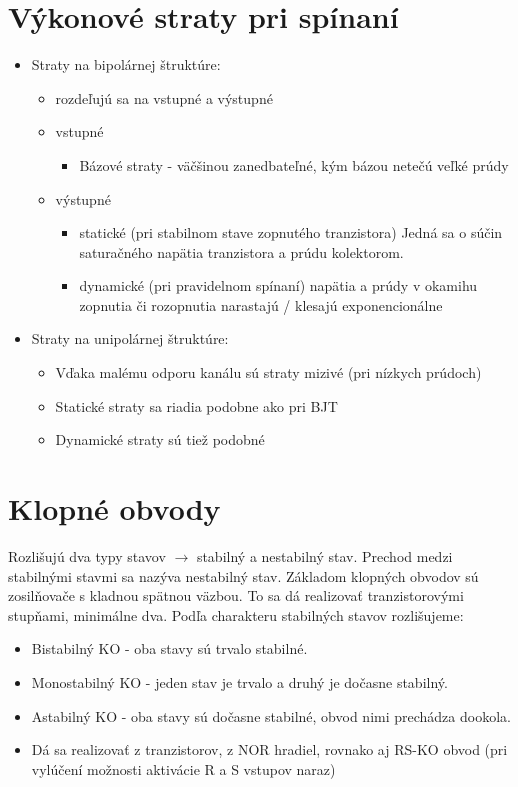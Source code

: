\section{Výkonové straty pri spínaní}
\begin{itemize}
	\item  Straty na bipolárnej štruktúre:
	\begin{itemize}
		\item rozdeľujú sa na vstupné a výstupné
		\item vstupné
		\begin{itemize}
			\item Bázové straty - väčšinou zanedbateľné, kým bázou netečú veľké prúdy
		\end{itemize}
		\item výstupné
		\begin{itemize}
			\item statické (pri stabilnom stave zopnutého tranzistora)
			\subitem Jedná sa o súčin saturačného napätia tranzistora a prúdu kolektorom.
			\item dynamické (pri pravidelnom spínaní)
			\subitem napätia a prúdy v okamihu zopnutia či rozopnutia narastajú / klesajú exponencionálne
		\end{itemize}
	\end{itemize}
	\item  Straty na unipolárnej štruktúre:
	\begin{itemize}
		\item Vďaka malému odporu kanálu sú straty mizivé (pri nízkych prúdoch)
		\item Statické straty sa riadia podobne ako pri BJT
		\item Dynamické straty sú tiež podobné
	\end{itemize}
\end{itemize}
\section{Klopné obvody}
Rozlišujú dva typy stavov $\rightarrow$ stabilný a nestabilný stav. Prechod medzi stabilnými stavmi sa nazýva nestabilný stav. Základom klopných obvodov sú zosilňovače s kladnou spätnou väzbou. To sa dá realizovať tranzistorovými stupňami, minimálne dva. Podľa charakteru stabilných stavov rozlišujeme:
\begin{itemize}
	\item Bistabilný KO - oba stavy sú trvalo stabilné.
	\item Monostabilný KO - jeden stav je trvalo a druhý je dočasne stabilný.
	\item Astabilný KO - oba stavy sú dočasne stabilné, obvod nimi prechádza dookola.
	\item Dá sa realizovať z tranzistorov, z NOR hradiel, rovnako aj RS-KO obvod (pri vylúčení možnosti aktivácie R a S vstupov naraz)
\end{itemize}


